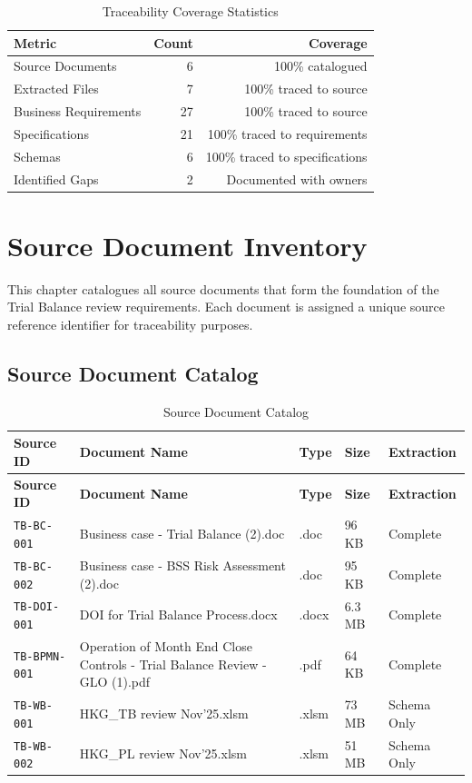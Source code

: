 \documentclass[11pt,a4paper,twoside]{report}
\newcommand{\srcref}[1]{\texttt{#1}}
\begin{document}
\begin{table}[h]
\centering
\caption{Traceability Coverage Statistics}
\label{tab:coverage-statistics}
\begin{tabular}{@{}lrr@{}}
\toprule
\textbf{Metric} & \textbf{Count} & \textbf{Coverage} \\
\midrule
Source Documents & 6 & 100\% catalogued \\
Extracted Files & 7 & 100\% traced to source \\
Business Requirements & 27 & 100\% traced to source \\
Specifications & 21 & 100\% traced to requirements \\
Schemas & 6 & 100\% traced to specifications \\
Identified Gaps & 2 & Documented with owners \\
\bottomrule
\end{tabular}
\end{table}
\chapter{Source Document Inventory}
\label{ch:source-documents}

This chapter catalogues all source documents that form the foundation
of the Trial Balance review requirements. Each document is assigned a
unique source reference identifier for traceability purposes.

\section{Source Document Catalog}
\label{sec:source-catalog}

\begin{longtable}{@{}C{2cm}L{5cm}C{1.5cm}C{2cm}C{2.5cm}@{}}
\caption{Source Document Catalog}
\label{tab:source-catalog} \\
\toprule
\textbf{Source ID} & \textbf{Document Name} & \textbf{Type} & \textbf{Size} & \textbf{Extraction} \\
\midrule
\endfirsthead
\toprule
\textbf{Source ID} & \textbf{Document Name} & \textbf{Type} & \textbf{Size} & \textbf{Extraction} \\
\midrule
\endhead
\srcref{TB-BC-001} & Business case - Trial Balance (2).doc & .doc & 96 KB & Complete \\
\srcref{TB-BC-002} & Business case - BSS Risk Assessment (2).doc & .doc & 95 KB & Complete \\
\srcref{TB-DOI-001} & DOI for Trial Balance Process.docx & .docx & 6.3 MB & Complete \\
\srcref{TB-BPMN-001} & Operation of Month End Close Controls - Trial Balance Review - GLO (1).pdf & .pdf & 64 KB & Complete \\
\srcref{TB-WB-001} & HKG\_TB review Nov'25.xlsm & .xlsm & 73 MB & Schema Only \\
\srcref{TB-WB-002} & HKG\_PL review Nov'25.xlsm & .xlsm & 51 MB & Schema Only \\
\bottomrule
\end{longtable}
\end{document}
